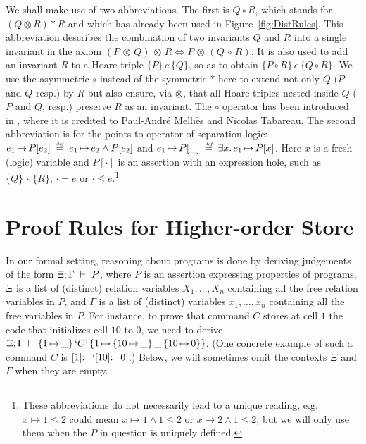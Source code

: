 \documentclass{LMCS}
\theoremstyle{remark}
\newcommand{\QUOTE}[1]{\textnormal{`\ensuremath{#1}'}}
\newcommand{\defeq}{\ensuremath{\stackrel{\mbox{\tiny \it def}}{=}}}
\newcommand{\triple}[3]{{\ensuremath{\!\left.\{ #1 \}\, #2\, \{  #3 \}\!\right.}}}
\newcommand{\pointsto}{\ensuremath{\mapsto}}
\newcommand{\ntria}[4]{{{#1}\,{\mapsto}\,{{\{{#2}\}}{\, #3\, }{\{{#4}\}}}}\xspace}
\newcommand{\HOLE}{\ensuremath{\cdot}}
\newcommand{\X}{\ensuremath{\Xi}}
\begin{document}
We shall make use of two abbreviations. The first is $Q\circ R$, which stands for $(Q\otimes R)  * R$
 and which has already been used in Figure~\ref{fig:DistRules}.
This abbreviation describes the  combination of two invariants $Q$ and $R$ into a single invariant in the axiom $(P\,{\otimes}\,Q)\,{\otimes}\, R\Leftrightarrow P\,{\otimes}\,(Q\,{\circ}\, R)$. It is also 
used to add an invariant $R$ to a Hoare triple $\triple{P}{e}{Q}$,
so as to obtain $\triple{P\circ R}{e}{Q\circ R}$. We use the asymmetric 
$\circ$ instead of the symmetric $*$ here to extend not only $Q$ ($P$ and $Q$ resp.) by $R$ but also ensure, via $\otimes$, that all Hoare triples nested inside $Q$ ($P$ and $Q$, resp.) preserve $R$ as an invariant. The $\circ$ operator has been introduced in \cite{Pottier:08}, where it is credited to Paul-Andr\'{e} Melli\`{e}s and Nicolas Tabareau. 
The second abbreviation is for the points-to operator  of separation logic:
$e_1\,{\pointsto}\, P[e_2] 
\;\defeq\; 
e_1\,{\pointsto}\, e_2 \wedge P[e_2]$
and 
$e_1\,{\pointsto}\,P[\_] 
\;\defeq\; 
\exists x.\,e_1\,{\pointsto}\,P[x]$. 
Here $x$ is a fresh (logic) variable 
and $P[\HOLE]$ is an assertion with an expression hole, such as
$\triple{Q}{\HOLE}{R}$, 
$\HOLE = e$ or $\HOLE\leq e$.\footnote{These abbreviations do not necessarily lead to a unique reading, e.g.\  $x{\pointsto} 1\leq 2$ could mean $x{\pointsto} 1  \wedge  1\leq 2$  or $x{\pointsto} 2  \wedge  1\leq 2$, but we will only use them when the $P$ in question is uniquely defined.}



\section{Proof Rules for Higher-order Store}
\label{sec:ProgramLogic}

In our formal setting, reasoning about programs
is done by deriving  judgements of the form 
$\X;\Gamma \;\adash\; P$, 
where $P$ is an assertion expressing properties of programs, 
$\X$ is a list of (distinct) relation variables $X_1,\ldots,X_n$ containing all the free relation variables in $P$,  
and $\Gamma$ is a list of (distinct) variables $x_1,\ldots,x_n$ containing all the free
variables in $P$. For instance, to prove that command $C$ 
stores at cell $1$ the code that initializes cell $10$ to $0$, we need
to derive
$\X;\Gamma \,\adash\,
\triple{1\,{\pointsto}\,\_}{\QUOTE{C}}{\ntria{1}{10\,{\pointsto}\,\_}{\_}{10\,{\pointsto}\,0}}$. 
(One
concrete example of such a command $C$ is $[1]{:=}\QUOTE{[10]{:=}0}$.) 
Below, we will sometimes omit the contexts $\X$ and $\Gamma$ when they are empty.
\end{document}
